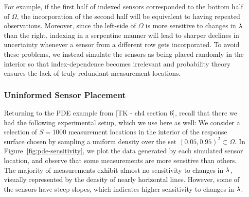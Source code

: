 For example, if the first half of indexed sensors corresponded to the bottom half of $\Omega$, the incorporation of the second half will be equivalent to having repeated observations.
Moreover, since the left-side of $\Omega$ is more sensitive to changes in $\lambda$ than the right, indexing in a serpentine manner will lead to sharper declines in uncertainty whenever a sensor from a different row gets incorporated.
To avoid these problems, we instead simulate the sensors as being placed randomly in the interior so that index-dependence becomes irrelevant and  probability theory ensures the lack of truly redundant measurement locations.

\subsubsection{Uninformed Sensor Placement}

Returning to the PDE example from [TK - ch4 section 6], recall that there we had the following experimental setup, which we use here as well:
We consider a selection of $S=1000$ measurement locations in the interior of the response surface chosen by sampling a uniform density over the set $(0.05, 0.95)^2 \subset \Omega$.
In Figure~\ref{fig:pde-sensitivity}, we plot the data generated by each simulated sensor location, and observe that some measurements are more sensitive than others.
The majority of measurements exhibit almost no sensitivity to changes in $\lambda$, visually represented by the density of nearly horizontal lines.
However, some of the sensors have steep slopes, which indicates higher sensitivity to changes in $\lambda$.


